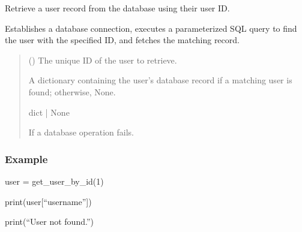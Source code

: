 \documentclass[letterpaper,10pt,english]{sphinxmanual}
\begin{document}

\begin{fulllineitems}
\label{\detokenize{modules:app.db.get_user_by_id}}
\pysigstartsignatures
\pysiglinewithargsret
{}
{}
{}
\pysigstopsignatures
\sphinxAtStartPar
Retrieve a user record from the database using their user ID.

\sphinxAtStartPar
Establishes a database connection, executes a parameterized SQL query
to find the user with the specified ID, and fetches the matching record.
\begin{quote}\begin{description}
\sphinxAtStartPar
{} () \textendash{} The unique ID of the user to retrieve.

\sphinxAtStartPar
A dictionary containing the user’s database record
if a matching user is found; otherwise, None.

\sphinxAtStartPar
dict | None

\sphinxAtStartPar
{} \textendash{} If a database operation fails.

\end{description}\end{quote}
\subsubsection*{Example}

\sphinxAtStartPar
user = get\_user\_by\_id(1)
\begin{description}
\sphinxAtStartPar
print(user{[}“username”{]})

\sphinxAtStartPar
print(“User not found.”)

\end{description}

\end{fulllineitems}

\end{document}
